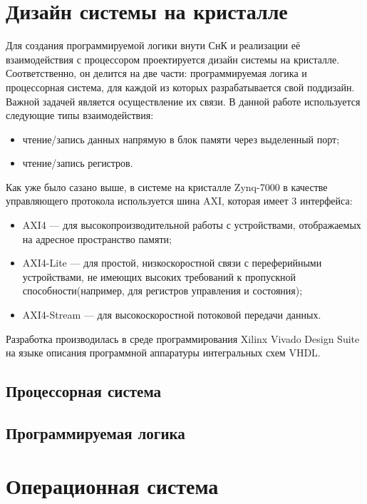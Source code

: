 \documentclass[a4paper, 14pt]{extarticle}
\begin{document}
\section{Дизайн системы на кристалле}
    Для создания программируемой логики внути СнК и реализации её взаимодействия с процессором проектируется дизайн системы на кристалле. Соответственно, он делится на две части: программируемая логика и процессорная система, для каждой из которых разрабатывается свой поддизайн. Важной задачей является осуществление их связи. В данной работе используется следующие типы взаимодействия:
    \begin{itemize}
        \item чтение/запись данных напрямую в блок памяти через выделенный порт;
        \item чтение/запись регистров.
    \end{itemize}\par
    Как уже было сазано выше, в системе на кристалле Zynq-7000 в качестве управляющего протокола используется шина AXI, которая имеет 3 интерфейса:
    \begin{itemize}
        \item AXI4 --- для высокопроизводительной работы с устройствами, отображаемых на адресное пространство памяти;
        \item AXI4-Lite --- для простой, низкоскоростной связи с переферийными устройствами, не имеющих высоких требований к пропускной способности(например, для регистров управления и состояния);
        \item AXI4-Stream --- для высокоскоростной потоковой передачи данных.
    \end{itemize}\par
    Разработка производилась в среде программирования Xilinx Vivado Design Suite на языке описания программной аппаратуры интегральных схем VHDL.
    
    \subsection{Процессорная система}
    
    \subsection{Программируемая логика}
    \newpage

\section{Операционная система}
\newpage
\end{document}
